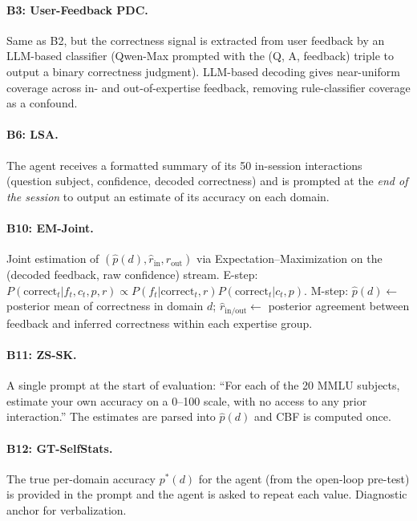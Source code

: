 \documentclass[11pt]{article}
\begin{document}
\paragraph{B3: User-Feedback PDC.} Same as B2, but the correctness signal is extracted from user feedback by an LLM-based classifier (Qwen-Max prompted with the (Q, A, feedback) triple to output a binary correctness judgment). LLM-based decoding gives near-uniform coverage across in- and out-of-expertise feedback, removing rule-classifier coverage as a confound.

\paragraph{B6: LSA.} The agent receives a formatted summary of its 50 in-session interactions (question subject, confidence, decoded correctness) and is prompted at the \emph{end of the session} to output an estimate of its accuracy on each domain.

\paragraph{B10: EM-Joint.} Joint estimation of $(\hat p(d), \hat r_{\text{in}}, \hat r_{\text{out}})$ via Expectation--Maximization on the (decoded feedback, raw confidence) stream. E-step: $P(\text{correct}_t | f_t, c_t, p, r) \propto P(f_t | \text{correct}_t, r) P(\text{correct}_t | c_t, p)$. M-step: $\hat p(d) \leftarrow$ posterior mean of correctness in domain $d$; $\hat r_{\text{in/out}} \leftarrow$ posterior agreement between feedback and inferred correctness within each expertise group.

\paragraph{B11: ZS-SK.} A single prompt at the start of evaluation: ``For each of the 20 MMLU subjects, estimate your own accuracy on a 0--100 scale, with no access to any prior interaction.'' The estimates are parsed into $\hat p(d)$ and CBF is computed once.

\paragraph{B12: GT-SelfStats.} The true per-domain accuracy $p^*(d)$ for the agent (from the open-loop pre-test) is provided in the prompt and the agent is asked to repeat each value. Diagnostic anchor for verbalization.
\end{document}
